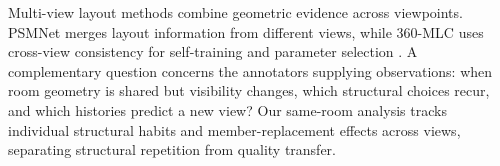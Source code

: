Multi-view layout methods combine geometric evidence across viewpoints. PSMNet merges layout information from different views, while 360-MLC uses cross-view consistency for self-training and parameter selection \cite{c2ref23,c2ref24}. A complementary question concerns the annotators supplying observations: when room geometry is shared but visibility changes, which structural choices recur, and which histories predict a new view? Our same-room analysis tracks individual structural habits and member-replacement effects across views, separating structural repetition from quality transfer.
